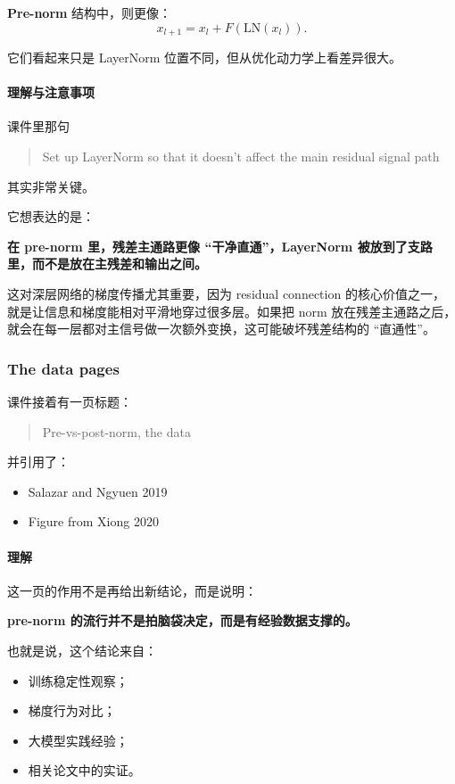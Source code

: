 \documentclass[a4paper,UTF8]{article}
\numberwithin{equation}{section}
\begin{document}
\textbf{Pre-norm} 结构中，则更像：
\[
x_{l+1} = x_l + F(\mathrm{LN}(x_l)).
\]

它们看起来只是 LayerNorm 位置不同，但从优化动力学上看差异很大。

\paragraph{理解与注意事项}
课件里那句
\begin{quote}
Set up LayerNorm so that it doesn’t affect the main residual signal path
\end{quote}
其实非常关键。

它想表达的是：

\begin{center}
\textbf{在 pre-norm 里，残差主通路更像 ``干净直通''，LayerNorm 被放到了支路里，而不是放在主残差和输出之间。}
\end{center}

这对深层网络的梯度传播尤其重要，因为 residual connection 的核心价值之一，就是让信息和梯度能相对平滑地穿过很多层。如果把 norm 放在残差主通路之后，就会在每一层都对主信号做一次额外变换，这可能破坏残差结构的 ``直通性''。

\subsubsection{The data pages}

课件接着有一页标题：
\begin{quote}
Pre-vs-post-norm, the data
\end{quote}

并引用了：
\begin{itemize}
    \item Salazar and Ngyuen 2019
    \item Figure from Xiong 2020
\end{itemize}

\paragraph{理解}
这一页的作用不是再给出新结论，而是说明：
\begin{center}
\textbf{pre-norm 的流行并不是拍脑袋决定，而是有经验数据支撑的。}
\end{center}

也就是说，这个结论来自：
\begin{itemize}
    \item 训练稳定性观察；
    \item 梯度行为对比；
    \item 大模型实践经验；
    \item 相关论文中的实证。
\end{itemize}
\end{document}
